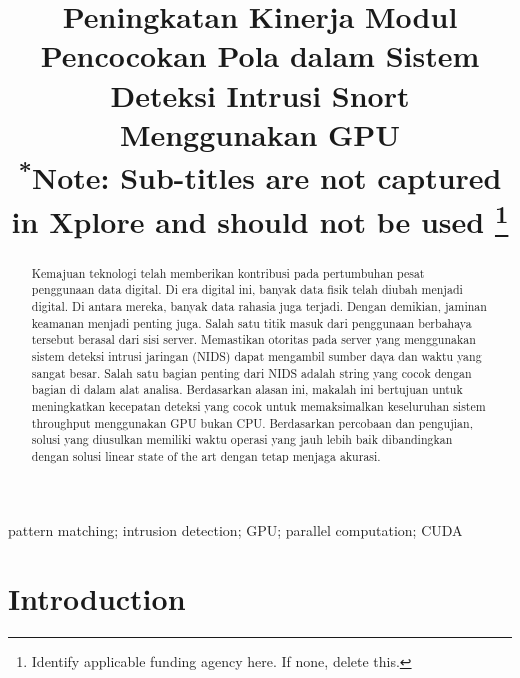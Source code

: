 \documentclass[conference]{IEEEtran}
\begin{document}
\title{Peningkatan Kinerja Modul Pencocokan Pola dalam Sistem Deteksi Intrusi Snort Menggunakan GPU\\
{\footnotesize \textsuperscript{*}Note: Sub-titles are not captured in Xplore and
should not be used}
\thanks{Identify applicable funding agency here. If none, delete this.}
}

\author{
\and
{}
}

\maketitle

\begin{abstract}
    Kemajuan teknologi telah memberikan kontribusi pada pertumbuhan pesat penggunaan data digital. Di era digital ini, banyak data fisik telah diubah menjadi digital. Di antara mereka, banyak data rahasia juga terjadi. Dengan demikian, jaminan keamanan menjadi penting juga. Salah satu titik masuk dari penggunaan berbahaya tersebut berasal dari sisi server. Memastikan otoritas pada server yang menggunakan sistem deteksi intrusi jaringan (NIDS) dapat mengambil sumber daya dan waktu yang sangat besar. Salah satu bagian penting dari NIDS adalah string yang cocok dengan bagian di dalam alat analisa. Berdasarkan alasan ini, makalah ini bertujuan untuk meningkatkan kecepatan deteksi yang cocok untuk memaksimalkan keseluruhan sistem throughput menggunakan GPU bukan CPU. Berdasarkan percobaan dan pengujian, solusi yang diusulkan memiliki waktu operasi yang jauh lebih baik dibandingkan dengan solusi linear state of the art dengan tetap menjaga akurasi.
\end{abstract}

\begin{IEEEkeywords}
    pattern matching; intrusion detection; GPU; parallel computation; CUDA
\end{IEEEkeywords}

\section{Introduction}
\end{document}
